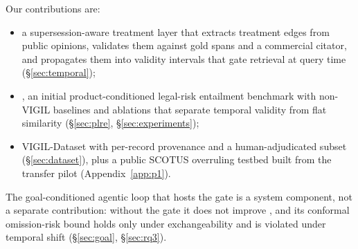 Our contributions are:
\begin{itemize}[leftmargin=*]
\item a supersession-aware treatment layer that extracts treatment edges from public opinions, validates them against gold spans and a commercial citator, and propagates them into validity intervals that gate retrieval at query time (\S\ref{sec:temporal});
\item \plre{}, an initial product-conditioned legal-risk entailment benchmark with non-VIGIL baselines and ablations that separate temporal validity from flat similarity (\S\ref{sec:plre}, \S\ref{sec:experiments});
\item VIGIL-Dataset with per-record provenance and a human-adjudicated subset (\S\ref{sec:dataset}), plus a public SCOTUS overruling testbed built from the transfer pilot (Appendix~\ref{app:p1}).
\end{itemize}
The goal-conditioned agentic loop that hosts the gate is a system component, not a separate contribution: without the gate it does not improve \plre{}, and its conformal omission-risk bound holds only under exchangeability and is violated under temporal shift (\S\ref{sec:goal}, \S\ref{sec:rq3}).
